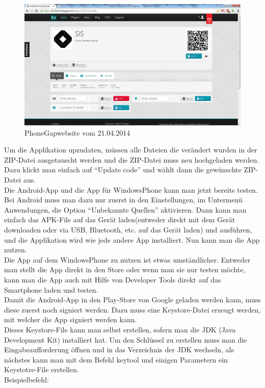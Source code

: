 \begin{figure}[H]
\centering
\includegraphics[keepaspectratio=true, width=14cm]{images/phoneGap/PhoneGap2.png}
\caption{PhoneGapwebsite vom 21.04.2014}
\end{figure}

Um die Applikation upzudaten, müssen alle Dateien die verändert wurden in der ZIP-Datei ausgetauscht werden und die ZIP-Datei muss neu hochgeladen werden. Dazu klickt man einfach auf \enquote{Update code} und wählt dann die gewünschte ZIP-Datei aus.\\
Die Android-App und die App für WindowsPhone kann man jetzt bereits testen. Bei Android muss man dazu nur zuerst in den Einstellungen, im Untermenü Anwendungen, die Option \enquote{Unbekannte Quellen} aktivieren. Dann kann man einfach das APK-File auf das Gerät laden(entweder direkt mit dem Gerät downloaden oder via USB, Bluetooth, etc. auf das Gerät laden) und ausführen, und die Applikation wird wie jede andere App installiert. Nun kann man die App nutzen.\\
Die App auf dem WindowsPhone zu nutzen ist etwas umständlicher. Entweder man stellt die App direkt in den Store oder wenn man sie nur testen möchte, kann man die App auch mit Hilfe von Developer Tools direkt auf das Smartphone laden und testen.\\
Damit die Android-App in den Play-Store von Google geladen werden kann, muss diese zuerst noch signiert werden. Dazu muss eine Keystore-Datei erzeugt werden, mit welcher die App signiert werden kann.\\
Dieses Keystore-File kann man selbst erstellen, sofern man die JDK (Java Development Kit) installiert hat. Um den Schlüssel zu erstellen muss man die Eingabeaufforderung öffnen und in das Verzeichnis der JDK wechseln, als nächstes kann man mit dem Befehl keytool und einigen Parametern ein Keystotre-File erstellen.\\
Beispielbefehl:\\

